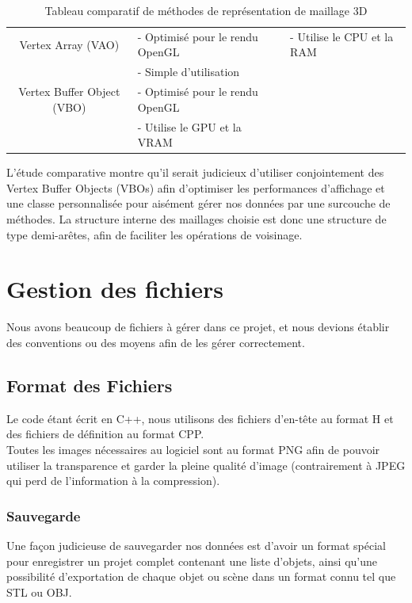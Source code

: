 \documentclass[a4paper]{memoir}
\begin{document}
\begin{table}[H]
\begin{small}
\begin{tabular}{| c | l | l |}
							\hline
							Vertex Array (VAO) & - Optimisé pour le rendu OpenGL & - Utilise le CPU et la RAM\\
							 & - Simple d'utilisation & \\
							\hline
							Vertex Buffer Object (VBO) & - Optimisé pour le rendu OpenGL & \\
							 & - Utilise le GPU et la VRAM & \\
							\hline
						\end{tabular}
					\end{small}
					\label{tab:maillage}
					\caption{Tableau comparatif de méthodes de représentation de maillage 3D}
				\end{table}
				L'étude comparative montre qu'il serait judicieux d'utiliser conjointement des Vertex Buffer Objects (VBOs) afin d'optimiser les 
				performances d'affichage et une classe personnalisée pour aisément gérer nos données par une surcouche de méthodes. La structure interne des 
				maillages choisie est donc une structure de type demi-arêtes, afin de faciliter les opérations de voisinage.
			
		\section{Gestion des fichiers}
			Nous avons beaucoup de fichiers à gérer dans ce projet, et nous devions établir des conventions ou des moyens afin de les gérer correctement.
			
			\subsection{Format des Fichiers}
				Le code étant écrit en C++, nous utilisons des fichiers d'en-tête au format H et des fichiers de définition au format CPP.\\
				Toutes les images nécessaires au logiciel sont au format PNG afin de pouvoir utiliser la transparence et garder la pleine qualité d'image 
				(contrairement à JPEG qui perd de l'information à la compression).\\
			
				\subsubsection{Sauvegarde}
					Une façon judicieuse de sauvegarder nos données est d'avoir un format spécial pour enregistrer un projet complet contenant une liste 
					d'objets, ainsi qu'une possibilité d'exportation de chaque objet ou scène dans un format connu tel que STL ou OBJ.
			
\end{document}
